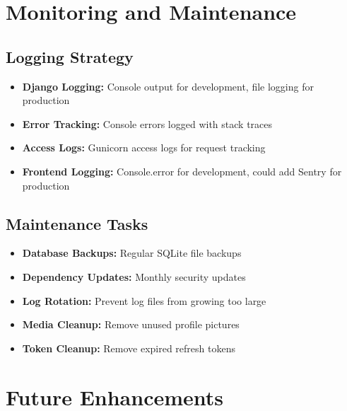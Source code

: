 \documentclass[11pt,a4paper]{article}
\begin{document}
\section{Monitoring and Maintenance}

\subsection{Logging Strategy}
\begin{itemize}[leftmargin=*]
    \item \textbf{Django Logging:} Console output for development, file logging for production
    \item \textbf{Error Tracking:} Console errors logged with stack traces
    \item \textbf{Access Logs:} Gunicorn access logs for request tracking
    \item \textbf{Frontend Logging:} Console.error for development, could add Sentry for production
\end{itemize}

\subsection{Maintenance Tasks}
\begin{itemize}[leftmargin=*]
    \item \textbf{Database Backups:} Regular SQLite file backups
    \item \textbf{Dependency Updates:} Monthly security updates
    \item \textbf{Log Rotation:} Prevent log files from growing too large
    \item \textbf{Media Cleanup:} Remove unused profile pictures
    \item \textbf{Token Cleanup:} Remove expired refresh tokens
\end{itemize}

\section{Future Enhancements}
\end{document}

